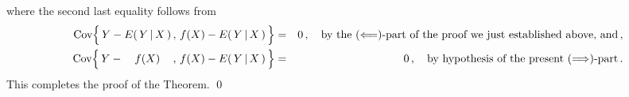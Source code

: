 where the second last equality follows from
\begin{eqnarray*}
\Cov\!\left\{\,
	Y \overset{{\color{white}.}}{-} E(\,Y\,\vert\,X\,)
	\,,\,
	f(X) \overset{{\color{white}.}}{-} E(\,Y\,\vert\,X\,)
	\,\right\}
&=& 0\,,
\quad\textnormal{by the $(\Longleftarrow)$-part of the proof we just established above, and}\,,
\\
\Cov\!\left\{\,
	Y \overset{{\color{white}.}}{-} {\color{white}11} f(X) {\color{white}11}
	\,,\,
	f(X) \overset{{\color{white}.}}{-} E(\,Y\,\vert\,X\,)
	\,\right\}
&=& 0\,,
\quad\textnormal{by hypothesis of the present $(\Longrightarrow)$-part}\,.
\end{eqnarray*}
This completes the proof of the Theorem.
\qed


\renewcommand{\theenumi}{\roman{enumi}}
\renewcommand{\labelenumi}{\textnormal{(\theenumi)}$\;\;$}

